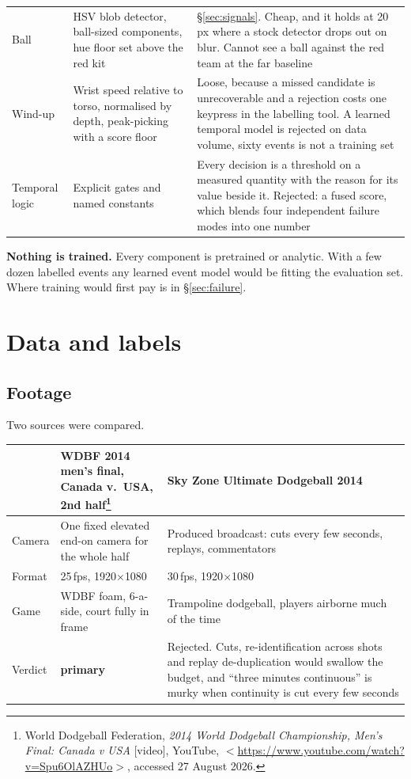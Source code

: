\documentclass[10pt,a4paper]{article}
\begin{document}
{\begin{xltabular}{\textwidth}{L{29mm} L{30mm} X}
Ball & HSV blob detector, ball-sized components, hue floor set above the red kit & \S\ref{sec:signals}. Cheap, and it holds at 20\,px where a stock detector drops out on blur. Cannot see a ball against the red team at the far baseline\\
Wind-up & Wrist speed relative to torso, normalised by depth, peak-picking with a score floor & Loose, because a missed candidate is unrecoverable and a rejection costs one keypress in the labelling tool. A learned temporal model is rejected on data volume, sixty events is not a training set\\
Temporal logic & Explicit gates and named constants & Every decision is a threshold on a measured quantity with the reason for its value beside it. Rejected: a fused score, which blends four independent failure modes into one number\\
\bottomrule
\end{xltabular}}

\textbf{Nothing is trained.} Every component is pretrained or analytic. With a few dozen
labelled events any learned event model would be fitting the evaluation set. Where training
would first pay is in \S\ref{sec:failure}.

\section{Data and labels}

\subsection{Footage}

Two sources were compared.

{\footnotesize
\begin{xltabular}{\textwidth}{L{22mm} X X}
\toprule
 & \textbf{WDBF 2014 men's final, Canada v.\ USA, 2nd half}\footnote{World Dodgeball
Federation, \emph{2014 World Dodgeball Championship, Men's Final: Canada v USA} [video],
YouTube, $<$\url{https://www.youtube.com/watch?v=Spu6OlAZHUo}$>$, accessed 27 August 2026.}
& \textbf{Sky Zone Ultimate Dodgeball 2014}\\
\midrule
Camera & One fixed elevated end-on camera for the whole half & Produced broadcast: cuts every few seconds, replays, commentators\\
Format & 25\,fps, 1920$\times$1080 & 30\,fps, 1920$\times$1080\\
Game & WDBF foam, 6-a-side, court fully in frame & Trampoline dodgeball, players airborne much of the time\\
Verdict & \textbf{primary} & Rejected. Cuts, re-identification across shots and replay de-duplication would swallow the budget, and ``three minutes continuous'' is murky when continuity is cut every few seconds\\
\bottomrule
\end{xltabular}}
\end{document}
